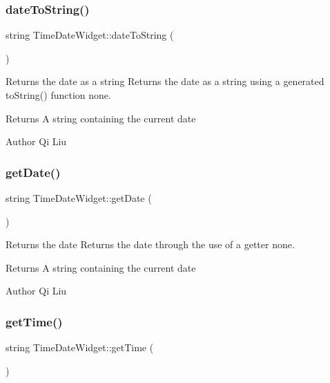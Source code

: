 \subsubsection{\texorpdfstring{date\+To\+String()}{dateToString()}}
{\footnotesize\ttfamily string Time\+Date\+Widget\+::date\+To\+String (\begin{DoxyParamCaption}{ }\end{DoxyParamCaption})}



Returns the date as a string  Returns the date as a string using a generated to\+String() function  none. 

\begin{DoxyReturn}{Returns}
A string containing the current date 
\end{DoxyReturn}
\begin{DoxyAuthor}{Author}
Qi Liu 
\end{DoxyAuthor}
\mbox{\label{class_time_date_widget_ac35ae151576ef382ca6ae7d8011357cf}} 
\subsubsection{\texorpdfstring{get\+Date()}{getDate()}}
{\footnotesize\ttfamily string Time\+Date\+Widget\+::get\+Date (\begin{DoxyParamCaption}{ }\end{DoxyParamCaption})}



Returns the date  Returns the date through the use of a getter  none. 

\begin{DoxyReturn}{Returns}
A string containing the current date 
\end{DoxyReturn}
\begin{DoxyAuthor}{Author}
Qi Liu 
\end{DoxyAuthor}
\mbox{\label{class_time_date_widget_a63a3ea239ff728c0dbf3c0ca2caa5be5}} 
\subsubsection{\texorpdfstring{get\+Time()}{getTime()}}
{\footnotesize\ttfamily string Time\+Date\+Widget\+::get\+Time (\begin{DoxyParamCaption}{ }\end{DoxyParamCaption})}



